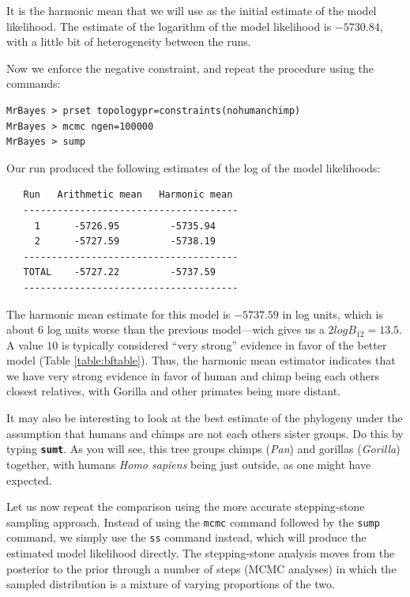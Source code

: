 \documentclass[12pt]{book}
\newcommand{\ttt}[1]{\texttt{#1}}
\newcommand{\tb}[1]{\ttt{\textbf{#1}}}
\begin{document}
It is the harmonic mean that we will use as the initial estimate of the model likelihood. The
estimate of the logarithm of the model likelihood is $-5730.84$, with a little bit of heterogeneity
between the runs.

Now we enforce the negative constraint, and repeat the procedure using the commands:

\begin{singlespacing}
\small
\begin{verbatim}
MrBayes > prset topologypr=constraints(nohumanchimp)
MrBayes > mcmc ngen=100000
MrBayes > sump
\end{verbatim}
\end{singlespacing}
\normalsize

Our run produced the following estimates of the log of the model likelihoods:

\begin{singlespacing}
\footnotesize
\begin{verbatim}
   Run   Arithmetic mean   Harmonic mean
   --------------------------------------
     1      -5726.95         -5735.94
     2      -5727.59         -5738.19
   --------------------------------------
   TOTAL    -5727.22         -5737.59
   --------------------------------------
\end{verbatim}
\end{singlespacing}
\normalsize

The harmonic mean estimate for this model is $-5737.59$ in log units, which is about 6 log units
worse than the previous model---wich gives us a $2logB_{12} = 13.5$. A value $10$ is typically
considered ``very strong'' evidence in favor of the better model (Table \ref{table:bftable}). Thus,
the harmonic mean estimator indicates that we have very strong evidence in favor of human and chimp
being each others closest relatives, with Gorilla and other primates being more distant.

It may also be interesting to look at the best estimate of the phylogeny under the assumption that
humans and chimps are not each others sister groups. Do this by typing \tb{sumt}. As you will see,
this tree groups chimps (\textit{Pan}) and gorillas (\textit{Gorilla}) together, with humans
\textit{Homo sapiens} being just outside, as one might have expected.

Let us now repeat the comparison using the more accurate stepping-stone sampling approach. Instead
of using the \ttt{mcmc} command followed by the \ttt{sump} command, we simply use the \ttt{ss}
command instead, which will produce the estimated model likelihood directly. The stepping-stone
analysis moves from the posterior to the prior through a number of steps (MCMC analyses) in which
the sampled distribution is a mixture of varying proportions of the two.
\end{document}
